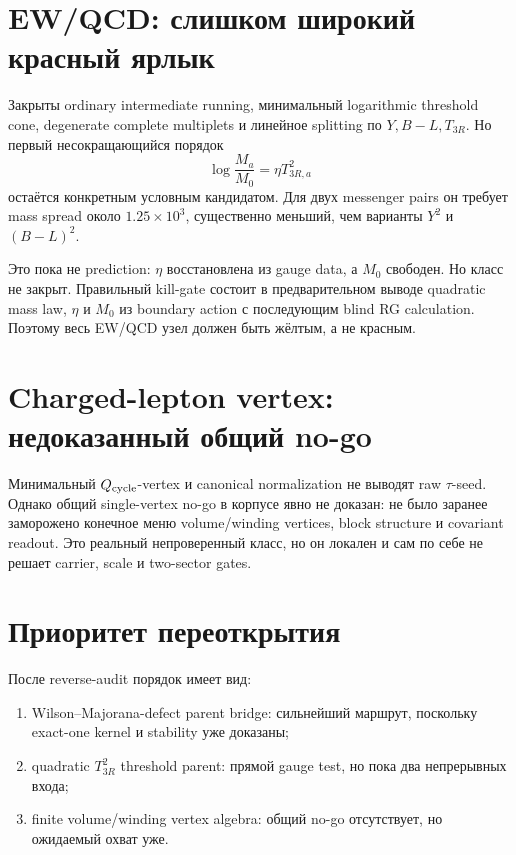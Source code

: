 \section{EW/QCD: слишком широкий красный ярлык}

Закрыты ordinary intermediate running, минимальный logarithmic threshold
cone, degenerate complete multiplets и линейное splitting по
\(Y,B-L,T_{3R}\). Но первый несокращающийся порядок
\begin{equation}
 \log\frac{M_a}{M_0}=\eta T_{3R,a}^2
\end{equation}
остаётся конкретным условным кандидатом. Для двух messenger pairs он требует
mass spread около \(1.25\times10^3\), существенно меньший, чем варианты
\(Y^2\) и \((B-L)^2\).

Это пока не prediction: \(\eta\) восстановлена из gauge data, а \(M_0\)
свободен. Но класс не закрыт. Правильный kill-gate состоит в предварительном
выводе quadratic mass law, \(\eta\) и \(M_0\) из boundary action с
последующим blind RG calculation. Поэтому весь EW/QCD узел должен быть
жёлтым, а не красным.

\section{Charged-lepton vertex: недоказанный общий no-go}

Минимальный \(Q_{\rm cycle}\)-vertex и canonical normalization не выводят
raw \(\tau\)-seed. Однако общий single-vertex no-go в корпусе явно не
доказан: не было заранее заморожено конечное меню volume/winding vertices,
block structure и covariant readout. Это реальный непроверенный класс, но он
локален и сам по себе не решает carrier, scale и two-sector gates.

\section{Приоритет переоткрытия}

После reverse-audit порядок имеет вид:
\begin{enumerate}
 \item Wilson--Majorana-defect parent bridge: сильнейший маршрут, поскольку
 exact-one kernel и stability уже доказаны;
 \item quadratic \(T_{3R}^2\) threshold parent: прямой gauge test, но пока
 два непрерывных входа;
 \item finite volume/winding vertex algebra: общий no-go отсутствует, но
 ожидаемый охват уже.
\end{enumerate}

